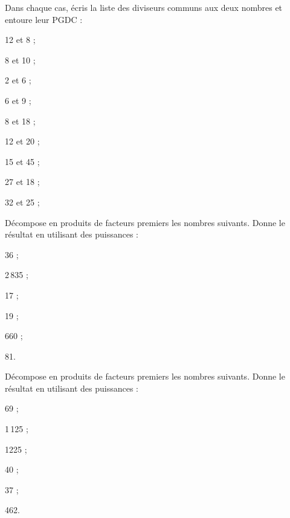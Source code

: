 

\begin{exercice}
Dans chaque cas, écris la liste des diviseurs communs aux deux nombres et entoure leur PGDC :
\begin{colenumerate}{3}
 \item 12 et 8 ;
 \item 8 et 10 ;
 \item 2 et 6 ;
 \item 6 et 9 ;
 \item 8 et 18 ;
 \item 12 et 20 ;
 \item 15 et 45 ;
 \item 27 et 18 ;
 \item 32 et 25 ;
  \end{colenumerate}
\end{exercice} 

\begin{exercice}
Décompose en produits de facteurs premiers les nombres suivants. Donne le résultat en utilisant des puissances :
\begin{colenumerate}{3}
 \item 36 ;
 \item 2\,835 ;
 \item 17 ;
 \item 19 ;
 \item 660 ;
 \item 81.
  \end{colenumerate}
\end{exercice} 

\begin{exercice}
Décompose en produits de facteurs premiers les nombres suivants. Donne le résultat en utilisant des puissances :
\begin{colenumerate}{3}
 \item 69 ;
 \item 1\,125 ;
 \item 1225 ;
 \item 40 ;
 \item 37 ;
 \item 462.
 \end{colenumerate}
\end{exercice} 

